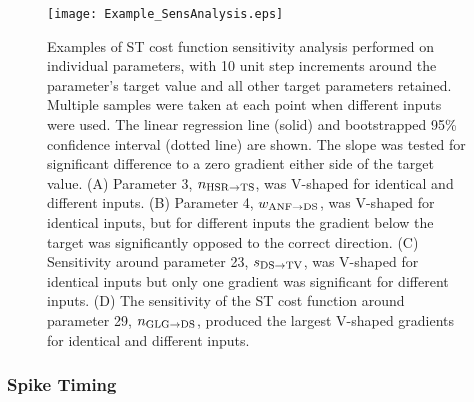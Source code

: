 % 




 \begin{figure}[tp!]
   \centering
   \texttt{[image: Example\_SensAnalysis.eps]}  
  \caption{Examples of ST cost function sensitivity analysis
    performed on individual parameters, with 10 unit step increments
    around the parameter's target value and all other target
    parameters retained. Multiple samples were taken at each point
    when different inputs were used. The linear regression line
    (solid) and bootstrapped 95\% confidence interval (dotted line)
    are shown. The slope was tested for significant difference to a
    zero gradient either side of the target value. (A) Parameter 3,
    $n_{{\rm HSR}\to {\rm TS}} $, was V-shaped for identical and
    different inputs. (B) Parameter 4, $w_{{\rm ANF}\to {\rm DS}} $,
    was V-shaped for identical inputs, but for different inputs the
    gradient below the target was significantly opposed to the
    correct direction. (C) Sensitivity around parameter 23, $s_{{\rm
        DS}\to {\rm TV}} $, was V-shaped for identical inputs but
    only one gradient was significant for different inputs. (D) The
    sensitivity of the ST cost function around parameter 29,
    $n_{{\rm GLG}\to {\rm DS}} $, produced the largest V-shaped
    gradients for identical and different inputs.}
  \label{fig:GA:R4}
\end{figure}

\subsubsection{Spike Timing}

